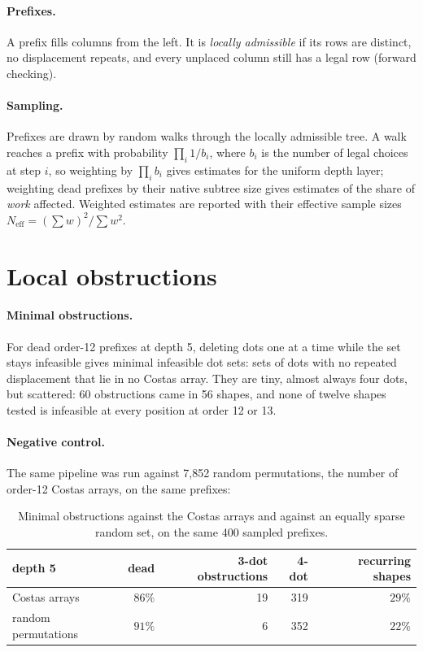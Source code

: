 \documentclass[11pt,a4paper,oneside]{report}
\theoremstyle{definition}
\begin{document}
\paragraph{Prefixes.} A prefix fills columns from the left. It is \emph{locally admissible} if its rows are
distinct, no displacement repeats, and every unplaced column still has a legal row (forward checking).

\paragraph{Sampling.} Prefixes are drawn by random walks through the locally admissible tree. A walk reaches
a prefix with probability $\prod_i 1/b_i$, where $b_i$ is the number of legal choices at step $i$, so weighting
by $\prod_i b_i$ gives estimates for the uniform depth layer; weighting dead prefixes by their native subtree
size gives estimates of the share of \emph{work} affected. Weighted estimates are reported with their
effective sample sizes $N_{\mathrm{eff}}=(\sum w)^2/\sum w^2$.

\section{Local obstructions}
\label{p10-sec:local}
\paragraph{Minimal obstructions.} For dead order-12 prefixes at depth 5, deleting dots one at a time while the
set stays infeasible gives minimal infeasible dot sets: sets of dots with no repeated displacement that lie
in no Costas array. They are tiny, almost always four dots, but scattered: 60 obstructions came in 56
shapes, and none of twelve shapes tested is infeasible at every position at order 12 or 13.

\paragraph{Negative control.} The same pipeline was run against 7{,}852 random permutations, the number of
order-12 Costas arrays, on the same prefixes:

\begin{table}[H]
\centering
\small
\begin{tabular}{@{}lrrrr@{}}
\toprule
depth 5 & dead & 3-dot obstructions & 4-dot & recurring shapes \\
\midrule
Costas arrays & $86\%$ & 19 & 319 & $29\%$ \\
random permutations & $91\%$ & 6 & 352 & $22\%$ \\
\bottomrule
\end{tabular}
\caption{Minimal obstructions against the Costas arrays and against an equally sparse random set, on the same
400 sampled prefixes.}
\label{p10-tab:control}
\end{table}
\end{document}
